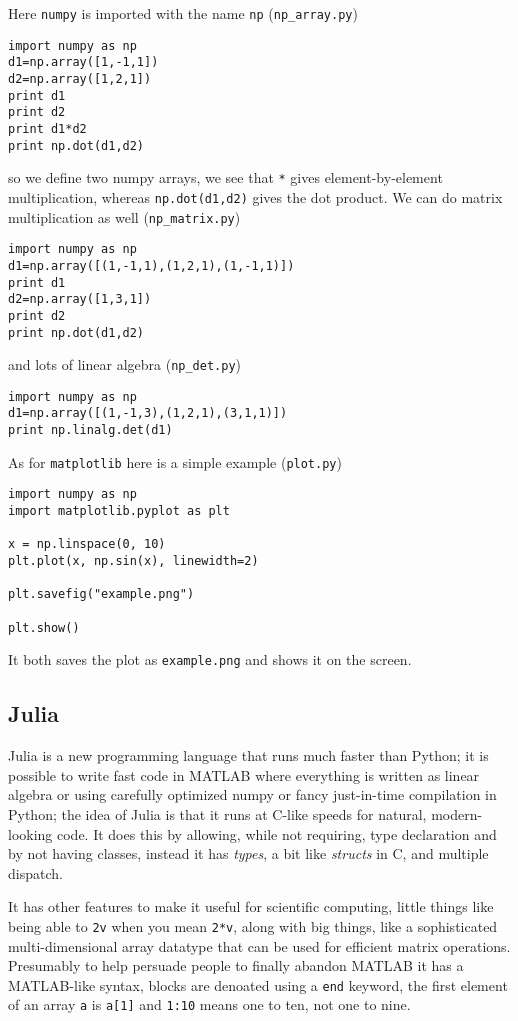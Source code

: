 \documentclass[12pt]{article}
\begin{document}
Here \texttt{numpy} is imported with the name \texttt{np}  (\texttt{np\_array.py})
\begin{lstlisting}[numbers=right]
import numpy as np
d1=np.array([1,-1,1])
d2=np.array([1,2,1])
print d1
print d2
print d1*d2
print np.dot(d1,d2)
\end{lstlisting}
so we define two numpy arrays, we see that \texttt{*} gives element-by-element multiplication, whereas \texttt{np.dot(d1,d2)} gives the dot product. We can do matrix multiplication as well  (\texttt{np\_matrix.py})
\begin{lstlisting}[numbers=right]
import numpy as np
d1=np.array([(1,-1,1),(1,2,1),(1,-1,1)])
print d1
d2=np.array([1,3,1])
print d2
print np.dot(d1,d2)
\end{lstlisting}
and lots of linear algebra  (\texttt{np\_det.py})
\begin{lstlisting}[numbers=right]
import numpy as np
d1=np.array([(1,-1,3),(1,2,1),(3,1,1)])
print np.linalg.det(d1)
\end{lstlisting}

As for \texttt{matplotlib} here is a simple example  (\texttt{plot.py})
\begin{lstlisting}[numbers=right]
import numpy as np
import matplotlib.pyplot as plt

x = np.linspace(0, 10)
plt.plot(x, np.sin(x), linewidth=2)

plt.savefig("example.png")

plt.show()
\end{lstlisting}
It both saves the plot as \texttt{example.png} and shows it on the screen.


\subsection*{Julia}
\lstset{language=python}
Julia is a new programming language that runs much faster than Python;
it is possible to write fast code in MATLAB where everything is
written as linear algebra or using carefully optimized numpy or fancy
just-in-time compilation in Python; the idea of Julia is that it runs
at C-like speeds for natural, modern-looking code. It does this by
allowing, while not requiring, type declaration and by not having
classes, instead it has \textsl{types}, a bit like \textsl{structs} in
C, and multiple dispatch. 

It has other features to make it useful for scientific computing,
little things like being able to \texttt{2v} when you mean
\texttt{2*v}, along with big things, like a sophisticated
multi-dimensional array datatype that can be used for efficient matrix
operations. Presumably to help persuade people to finally abandon
MATLAB it has a MATLAB-like syntax, blocks are denoated using a
\texttt{end} keyword, the first element of an array \texttt{a} is
\texttt{a[1]} and \texttt{1:10} means one to ten, not one to nine.
\end{document}
